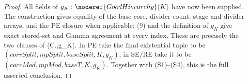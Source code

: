 \begin{proof}
All fields of \(g_K:\noderef{GoodHierarchy}(K)\) have now been supplied.
The construction gives equality of the base core, divider count, stage
and divider arrays, and the PE closure when applicable; (9) and the
definition of \(g_K\) give exact stored-set and Gamma agreement at every
index.  These are precisely the two clauses of
(C.,g_K).  In PE take the final
existential tuple to be
\((\mathit{corrSplit},\mathit{mpSplit},\mathit{baseSplit},K,g_K)\); in
SE/RE take it to be
\((\mathit{corrMod},\mathit{mpMod},\mathit{baseT},K,g_K)\).  Together
with (S1)--(S4), this is the full asserted conclusion.
\end{proof}
